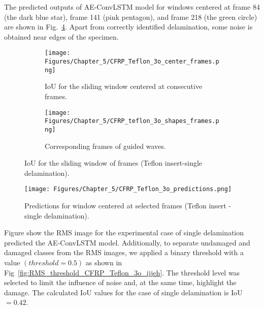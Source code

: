 The predicted outputs of AE-ConvLSTM model for windows centered at frame 84 (the dark blue star), frame 141 (pink pentagon), and frame 218 (the green circle) are shown in Fig.~\ref{fig:CFRP_Teflon_3o_predictions}.
Apart from correctly identified delamination, some noise is obtained near edges of the specimen.
\begin{figure} [!h]
	\begin{subfigure}[b]{1\textwidth}
		\centering
	\texttt{[image: Figures/Chapter\_5/CFRP\_Teflon\_3o\_center\_frames.png]}
		\caption{IoU for the sliding window centered at consecutive frames.}
		\label{fig:CFRP_Teflon_3o_center_frames}
	\end{subfigure}
	\par\medskip
	\begin{subfigure}[b]{1\textwidth}
		\centering
		\texttt{[image: Figures/Chapter\_5/CFRP\_teflon\_3o\_shapes\_frames.png]}
		\caption{Corresponding frames of guided waves.} 
		\label{fig:CFRP_teflon_3o_preds_frames}
	\end{subfigure}
	\caption{IoU for the sliding window of frames (Teflon insert-single delamination).}
	\label{fig:CFRP_Teflon_3o_IoU_centre_window}
\end{figure} 

\begin{figure}[!ht]
	\centering
	\texttt{[image: Figures/Chapter\_5/CFRP\_Teflon\_3o\_predictions.png]}
	\caption{Predictions for window centered at selected frames (Teflon insert - single delamination).}
	\label{fig:CFRP_Teflon_3o_predictions}
\end{figure}
Figure show the RMS image for the experimental case of single delamination predicted the AE-ConvLSTM model.
Additionally, to separate undamaged and damaged classes from the RMS images, we applied a binary threshold with a value \((threshold=0.5)\) as shown in Fig~\ref{fig:RMS_threshold_CFRP_Teflon_3o_ijjeh}. 
The threshold level was selected to limit the influence of noise and, at the same time, highlight the damage.
The calculated IoU values for the case of single delamination is IoU\(=0.42\).

